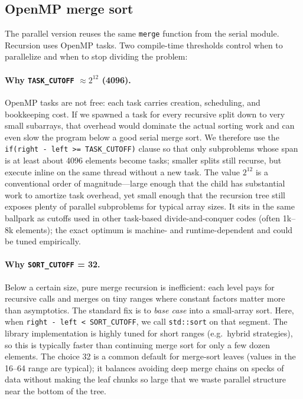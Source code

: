 \documentclass[11pt,a4paper]{article}
\begin{document}
\subsection{OpenMP merge sort}
The parallel version reuses the same \texttt{merge} function from the serial module. Recursion uses OpenMP tasks. Two compile-time thresholds control when to parallelize and when to stop dividing the problem:

\paragraph{Why \texttt{TASK\_CUTOFF} $\approx 2^{12}$ (4096).}
OpenMP tasks are not free: each task carries creation, scheduling, and bookkeeping cost. If we spawned a task for every recursive split down to very small subarrays, that overhead would dominate the actual sorting work and can even slow the program below a good serial merge sort. We therefore use the \texttt{if(right - left >= TASK\_CUTOFF)} clause so that only subproblems whose span is at least about 4096 elements become tasks; smaller splits still recurse, but execute inline on the same thread without a new task. The value $2^{12}$ is a conventional order of magnitude---large enough that the child has substantial work to amortize task overhead, yet small enough that the recursion tree still exposes plenty of parallel subproblems for typical array sizes. It sits in the same ballpark as cutoffs used in other task-based divide-and-conquer codes (often 1k--8k elements); the exact optimum is machine- and runtime-dependent and could be tuned empirically.

\paragraph{Why \texttt{SORT\_CUTOFF} = 32.}
Below a certain size, pure merge recursion is inefficient: each level pays for recursive calls and merges on tiny ranges where constant factors matter more than asymptotics. The standard fix is to \emph{base case} into a small-array sort. Here, when \texttt{right - left < SORT\_CUTOFF}, we call \texttt{std::sort} on that segment. The library implementation is highly tuned for short ranges (e.g.\ hybrid strategies), so this is typically faster than continuing merge sort for only a few dozen elements. The choice 32 is a common default for merge-sort leaves (values in the 16--64 range are typical); it balances avoiding deep merge chains on specks of data without making the leaf chunks so large that we waste parallel structure near the bottom of the tree.
\end{document}
